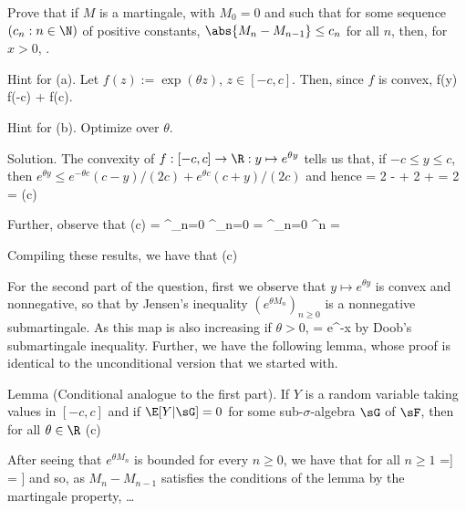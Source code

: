 \item [(b)] Prove that if $M$ is a martingale, with $M_0 = 0$ and such that for some sequence $(c_n : n \in\N)$ of positive constants, $\abs{M_n -M_{n-1}} \leq c_n$ for all $n$, then, for $x > 0$,
\be
\pro{} \leq \exp{}.
\ee
\een

Hint for (a). Let $f(z) := \exp(\theta z)$, $z \in [-c, c]$. Then, since $f$ is convex,
\be
f(y) \leq {} f(-c) + f(c).
\ee

Hint for (b). Optimize over $\theta$.

\scutline

Solution. The convexity of $f : [-c,c] \to \R : y \mapsto e^{\theta y}$ tells us that, if $-c \leq  y \leq  c$, then $e^{\theta y} \leq  e^{-\theta c}(c-y)/(2c)+ e^{\theta c}(c+y)/(2c)$ and hence
\be
\E[e^{\theta Y}] \leq \E{} = 2 -  \E[Y]+
2 +  \E[Y] = 2 = \cosh(\theta c)
\ee


Further, observe that
\be
\cosh(\theta c) = \sum^\infty_{n=0}  \leq  \sum^\infty_{n=0}  = \sum^\infty_{n=0}  \cdot {}^n = \exp{}
\ee

Compiling these results, we have that
\be
\E[e^{\theta Y}] \leq \cosh(\theta c) \leq \exp{}
\ee

For the second part of the question, first we observe that $y \mapsto e^{\theta y}$ is convex and nonnegative, so that by Jensen's inequality $(e^{\theta M_n})_{n\geq 0}$ is a nonnegative submartingale. As this map is also increasing if $\theta > 0$,
\be
\pro{} = \pro{} \leq  e^{-\theta x}\E[e^{\theta M_n}]
\ee
by Doob's submartingale inequality. Further, we have the following lemma, whose proof is identical to the unconditional version that we started with.

Lemma (Conditional analogue to the first part). If $Y$ is a random variable taking values in $[-c,c]$ and if $\E[Y|\sG ] = 0$ for some sub-$\sigma$-algebra $\sG$ of $\sF$, then for all $\theta \in \R$
\be
\E[e^{\theta Y} |\sG ] \leq \cosh(\theta c) \leq \exp{}
\ee

After seeing that $e^{\theta M_n}$ is bounded for every $n \geq 0$, we have that for all $n \geq 1$
\be
\E[e^{\theta M_n} ] =\E[\E[e^{\theta (M_n-M_{n-1})} e^{\theta M_{n-1}}|\sF_{n-1}]] = \E[e^{\theta M_{n-1}} \E[e^{\theta (M_n-M_{n-1})}|\sF_{n-1}]]
\ee
and so, as $M_n-M_{n-1}$ satisfies the conditions of the lemma by the martingale property,
\be
\E[e^{\theta M_n} ] \leq \exp{} \E[e^{\theta M_{n-1}}] \leq  \dots \leq \exp{}
\ee

